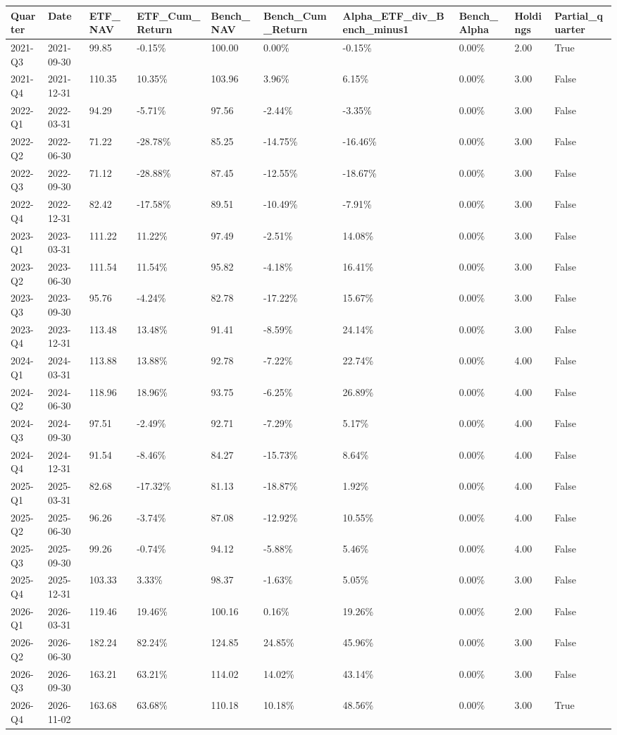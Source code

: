 \begin{longtable}{llllllllll}
Quarter & Date & ETF\_NAV & ETF\_Cum\_Return & Bench\_NAV & Bench\_Cum\_Return & Alpha\_ETF\_div\_Bench\_minus1 & Bench\_Alpha & Holdings & Partial\_quarter \\
\hline
2021-Q3 & 2021-09-30 & 99.85 & -0.15\% & 100.00 & 0.00\% & -0.15\% & 0.00\% & 2.00 & True \\
2021-Q4 & 2021-12-31 & 110.35 & 10.35\% & 103.96 & 3.96\% & 6.15\% & 0.00\% & 3.00 & False \\
2022-Q1 & 2022-03-31 & 94.29 & -5.71\% & 97.56 & -2.44\% & -3.35\% & 0.00\% & 3.00 & False \\
2022-Q2 & 2022-06-30 & 71.22 & -28.78\% & 85.25 & -14.75\% & -16.46\% & 0.00\% & 3.00 & False \\
2022-Q3 & 2022-09-30 & 71.12 & -28.88\% & 87.45 & -12.55\% & -18.67\% & 0.00\% & 3.00 & False \\
2022-Q4 & 2022-12-31 & 82.42 & -17.58\% & 89.51 & -10.49\% & -7.91\% & 0.00\% & 3.00 & False \\
2023-Q1 & 2023-03-31 & 111.22 & 11.22\% & 97.49 & -2.51\% & 14.08\% & 0.00\% & 3.00 & False \\
2023-Q2 & 2023-06-30 & 111.54 & 11.54\% & 95.82 & -4.18\% & 16.41\% & 0.00\% & 3.00 & False \\
2023-Q3 & 2023-09-30 & 95.76 & -4.24\% & 82.78 & -17.22\% & 15.67\% & 0.00\% & 3.00 & False \\
2023-Q4 & 2023-12-31 & 113.48 & 13.48\% & 91.41 & -8.59\% & 24.14\% & 0.00\% & 3.00 & False \\
2024-Q1 & 2024-03-31 & 113.88 & 13.88\% & 92.78 & -7.22\% & 22.74\% & 0.00\% & 4.00 & False \\
2024-Q2 & 2024-06-30 & 118.96 & 18.96\% & 93.75 & -6.25\% & 26.89\% & 0.00\% & 4.00 & False \\
2024-Q3 & 2024-09-30 & 97.51 & -2.49\% & 92.71 & -7.29\% & 5.17\% & 0.00\% & 4.00 & False \\
2024-Q4 & 2024-12-31 & 91.54 & -8.46\% & 84.27 & -15.73\% & 8.64\% & 0.00\% & 4.00 & False \\
2025-Q1 & 2025-03-31 & 82.68 & -17.32\% & 81.13 & -18.87\% & 1.92\% & 0.00\% & 4.00 & False \\
2025-Q2 & 2025-06-30 & 96.26 & -3.74\% & 87.08 & -12.92\% & 10.55\% & 0.00\% & 4.00 & False \\
2025-Q3 & 2025-09-30 & 99.26 & -0.74\% & 94.12 & -5.88\% & 5.46\% & 0.00\% & 4.00 & False \\
2025-Q4 & 2025-12-31 & 103.33 & 3.33\% & 98.37 & -1.63\% & 5.05\% & 0.00\% & 3.00 & False \\
2026-Q1 & 2026-03-31 & 119.46 & 19.46\% & 100.16 & 0.16\% & 19.26\% & 0.00\% & 2.00 & False \\
2026-Q2 & 2026-06-30 & 182.24 & 82.24\% & 124.85 & 24.85\% & 45.96\% & 0.00\% & 3.00 & False \\
2026-Q3 & 2026-09-30 & 163.21 & 63.21\% & 114.02 & 14.02\% & 43.14\% & 0.00\% & 3.00 & False \\
2026-Q4 & 2026-11-02 & 163.68 & 63.68\% & 110.18 & 10.18\% & 48.56\% & 0.00\% & 3.00 & True \\
\end{longtable}
